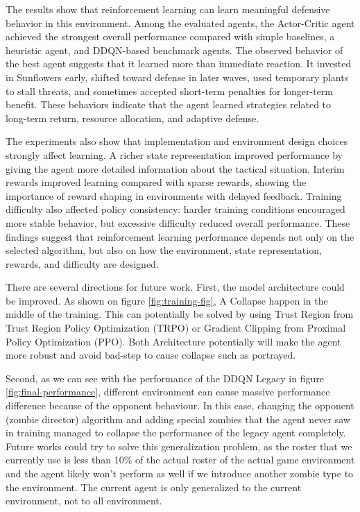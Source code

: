 \documentclass[conference,onecolumn]{IEEEtran}
\begin{document}
The results show that reinforcement learning can learn meaningful defensive behavior in this environment. Among the evaluated agents, the Actor-Critic agent achieved the strongest overall performance compared with simple baselines, a heuristic agent, and DDQN-based benchmark agents. The observed behavior of the best agent suggests that it learned more than immediate reaction. It invested in Sunflowers early, shifted toward defense in later waves, used temporary plants to stall threats, and sometimes accepted short-term penalties for longer-term benefit. These behaviors indicate that the agent learned strategies related to long-term return, resource allocation, and adaptive defense.

The experiments also show that implementation and environment design choices strongly affect learning. A richer state representation improved performance by giving the agent more detailed information about the tactical situation. Interim rewards improved learning compared with sparse rewards, showing the importance of reward shaping in environments with delayed feedback. Training difficulty also affected policy consistency: harder training conditions encouraged more stable behavior, but excessive difficulty reduced overall performance. These findings suggest that reinforcement learning performance depends not only on the selected algorithm, but also on how the environment, state representation, rewards, and difficulty are designed.

There are several directions for future work. First, the model architecture could be improved. As shown on figure \ref{fig:training-fig}, A Collapse happen in the middle of the training. This can potentially be solved by using Trust Region from Trust Region Policy Optimization (TRPO) or Gradient Clipping from Proximal Policy Optimization (PPO). Both Architecture potentially will make the agent more robust and avoid bad-step to cause collapse such as portrayed.

Second, as we can see with the performance of the DDQN Legacy in figure \ref{fig:final-performance}, different environment can cause massive performance difference because of the opponent behaviour. In this case, changing the opponent (zombie director) algorithm and adding special zombies that the agent never saw in training managed to collapse the performance of the legacy agent completely. Future works could try to solve this generalization problem, as the roster that we currently use is less than 10\% of the actual roster of the actual game environment and the agent likely won't perform as well if we introduce another zombie type to the environment. The current agent is only generalized to the current environment, not to all environment.
\end{document}
